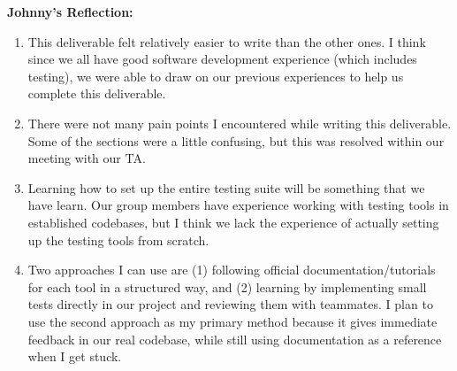 \documentclass[12pt, titlepage]{article}
\begin{document}
\noindent\textbf{Johnny's Reflection:}
\begin{enumerate}
  \item This deliverable felt relatively easier to write than the other ones. I think since we all have good software development experience (which includes testing), we were able to draw on our previous experiences to help us complete this deliverable.
  \item There were not many pain points I encountered while writing this deliverable. Some of the sections were a little confusing, but this was resolved within our meeting with our TA.
  \item Learning how to set up the entire testing suite will be something that we have learn. Our group members have experience working with testing tools in established codebases, but I think we lack the experience of actually setting up the testing tools from scratch.
  \item Two approaches I can use are (1) following official documentation/tutorials for each tool in a structured way, and (2) learning by implementing small tests directly in our project and reviewing them with teammates. I plan to use the second approach as my primary method because it gives immediate feedback in our real codebase, while still using documentation as a reference when I get stuck.
\end{enumerate}
\end{document}
